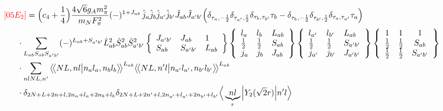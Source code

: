 \documentclass[master]{shnuthesis}
\newcommand{\llangle}{\big\langle\!\big\langle}
\newcommand{\rrangle}{\big\rangle\!\big\rangle}
\newcommand{\ap}{a^\prime}
\newcommand{\bp}{b^\prime}
\newcommand{\il}{\!\!\!\!\!\!\!\!\!\!}
\begin{document}
\begin{align}
    &\il {\color{red} [05E_2]} = \Big(c_4+\frac{1}{4}\Big)\frac{4\sqrt{6}g_A m_\pi^2}{m_N F_\pi^2} (-)^{1+J_{ab}}\,\hat{j}_a\hat{j}_b\hat{j}_{\ap}\hat{j}_{\bp}\hat{J}_{ab}\hat{J}_{\ap\bp} \Big( \delta_{\tau_a,-\frac{1}{2}}\delta_{\tau_{\ap},\frac{1}{2}}\delta_{\tau_b,\tau_{\bp}}\tau_b - \delta_{\tau_b,-\frac{1}{2}}\delta_{\tau_{\bp},\frac{1}{2}}\delta_{\tau_a,\tau_{\ap}}\tau_a \Big) \notag\\
    & \cdot \sum_{L_{ab}S_{ab}S_{\ap\bp}} (-)^{L_{ab}+S_{\ap\bp}} \hat{L}_{ab}^2\hat{S}_{ab}^2\hat{S}_{\ap\bp}^2  \left\{\begin{array}{lll} J_{\ap\bp} & J_{ab} & 1 \\ S_{ab} & S_{\ap\bp} & L_{ab} \end{array}\right\}  \left\{\begin{array}{lll}l_{a} & l_{b} & L_{ab} \\ \frac{1}{2} & \frac{1}{2} & S_{ab} \\j_{a} & j_{b} & J_{ab} \end{array}\right\} \left\{\begin{array}{lll}l_{\ap} & l_{\bp} & L_{ab} \\ \frac{1}{2} & \frac{1}{2} & S_{\ap\bp} \\j_{\ap} & j_{\bp} & J_{\ap\bp} \end{array}\right\}  \left\{\begin{array}{ccc} 1 & 1 & 1 \\ \frac{1}{2} & \frac{1}{2} & S_{ab} \\ \frac{1}{2} & \frac{1}{2} & S_{\ap\bp} \end{array}\right\}  \notag \\
    & \cdot \sum_{nlNL,n^\prime} \llangle N L, n l \big| n_{a} l_{a}, n_{b} l_{b} \rrangle^{L_{ab}} \llangle N L, n^\prime l \big| n_{a^\prime} l_{a^\prime}, n_{b^\prime} l_{b^\prime} \rrangle^{L_{ab}} \notag\\
    & \cdot \delta_{2N+L+2n+l,2n_a+l_a+2n_b+l_b}\delta_{2N+L+2n^\prime+l,2n_{a^\prime}+l_{a^\prime}+2n_{b^\prime}+l_{b^\prime}}  \Big\langle \underbrace{n l}_{r} \Big| Y_2(\sqrt{2}r) \Big| n^\prime l \Big\rangle
\end{align}
\,\\
\end{document}
